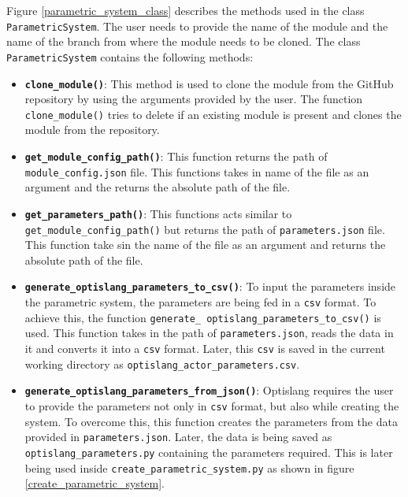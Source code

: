 Figure \ref{parametric_system_class} describes the methods used in the class \texttt{ParametricSystem}. The user needs to provide the name of the module and
the name of the branch from where the module needs to be cloned. The class \texttt{ParametricSystem} contains the following methods:  
\begin{itemize}
  \item \textbf{\texttt{clone\_module()}}:\newline
  This method is used to clone the module from the GitHub repository by using the arguments provided by the user. The function \texttt{clone\_module()} tries 
  to delete if an existing module is present and clones the module from the repository.

  \item \textbf{\texttt{get\_module\_config\_path()}}:\newline
  This function returns the path of \texttt{module\_config.json} file. This functions takes in name of the file as an argument and the returns the absolute path
  of the file.

  \item \textbf{\texttt{get\_parameters\_path()}}:\newline
  This functions acts similar to \texttt{get\_module\_config\_path()} but returns the path of \texttt{parameters.json} file. This function take sin the name of 
  the file as an argument and returns the absolute path of the file.
  
  \item \textbf{\texttt{generate\_optislang\_parameters\_to\_csv()}}:\newline
  To input the parameters inside the parametric system, the parameters are being fed in a \texttt{csv} format. To achieve this, the function \texttt{generate\_
  optislang\_parameters\_to\_csv()} is used. This function takes in the path of \texttt{parameters.json}, reads the data in it and converts it into a \texttt{csv}
  format. Later, this \texttt{csv} is saved in the current working directory as \texttt{optislang\_actor\_parameters.csv}.

  \item \textbf{\texttt{generate\_optislang\_parameters\_from\_json()}}:\newline
  Optislang requires the user to provide the parameters not only in \texttt{csv} format, but also while creating the system. To overcome this, this function
  creates the parameters from the data provided in \texttt{parameters.json}. Later, the data is being saved as \texttt{optislang\_parameters.py} containing the 
  parameters required. This is later being used inside \texttt{create\_parametric\_system.py} as shown in figure \ref{create_parametric_system}.


\end{itemize}
